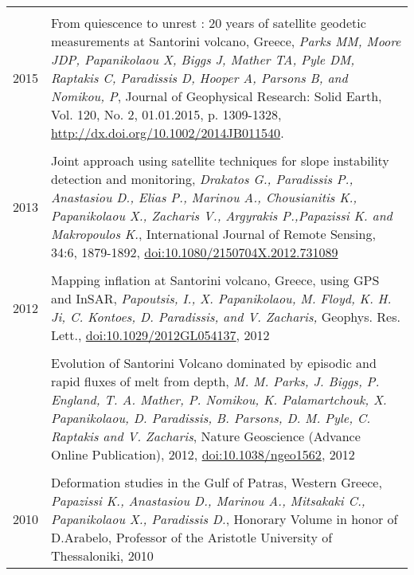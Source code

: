 \documentclass[a4paper,10pt]{article} %
\begin{document}
\begin{longtable}{r|p{14cm}}
\multicolumn{2}{c}{} \\
  \textsc{2015}

  & From quiescence to unrest : 20 years of satellite geodetic measurements at Santorini volcano, Greece,
  \emph{Parks MM, Moore JDP, Papanikolaou X, Biggs J, Mather TA, Pyle DM, Raptakis C, Paradissis D, Hooper A, Parsons B, and Nomikou, P}, Journal of Geophysical Research: Solid Earth, Vol. 120, No. 2, 01.01.2015, p. 1309-1328, \href{http://dx.doi.org/10.1002/2014JB011540}{http://dx.doi.org/10.1002/2014JB011540}.\\
  
\multicolumn{2}{c}{} \\ 
  \textsc{2013}

  & Joint approach using satellite techniques for slope instability detection and monitoring,
  \emph{Drakatos G., Paradissis P., Anastasiou D., Elias P., Marinou A., Chousianitis K., Papanikolaou X., Zacharis V., Argyrakis P.,Papazissi K. and Makropoulos K.},
  International Journal of Remote Sensing, 34:6, 1879-1892, \href{http://www.tandfonline.com/doi/abs/10.1080/2150704X.2012.731089#.Uxni9meIaig}{doi:10.1080/2150704X.2012.731089}\\

\multicolumn{2}{c}{} \\ 
  \textsc{2012}
  & Mapping inflation at Santorini volcano, Greece, using GPS and InSAR,
  \emph{Papoutsis, I., X. Papanikolaou, M. Floyd, K. H. Ji, C. Kontoes, D. Paradissis, and V. Zacharis,}
  Geophys. Res. Lett., \href{http://www.agu.org/pubs/crossref/pip/2012GL054137.shtml}{doi:10.1029/2012GL054137}, 2012\\

  &\\

  & Evolution of Santorini Volcano dominated by episodic and rapid fluxes of melt from depth,
  \emph{M. M. Parks, J. Biggs, P. England, T. A. Mather, P. Nomikou, K. Palamartchouk, X. Papanikolaou, D. Paradissis, B. Parsons, D. M. Pyle, C. Raptakis and V. Zacharis},
  Nature Geoscience (Advance Online Publication), 2012, \href{http://www.nature.com/ngeo/journal/v5/n10/full/ngeo1562.html}{doi:10.1038/ngeo1562}, 2012\\

\multicolumn{2}{c}{} \\ 
  \textsc{2010}
  & Deformation studies in the Gulf of Patras, Western Greece,
  \emph{Papazissi K., Anastasiou D., Marinou A., Mitsakaki C., Papanikolaou X., Paradissis D.}, 
  Honorary Volume in honor of D.Arabelo, Professor of the Aristotle University of Thessaloniki, 2010\\
\end{longtable}
\end{document}
